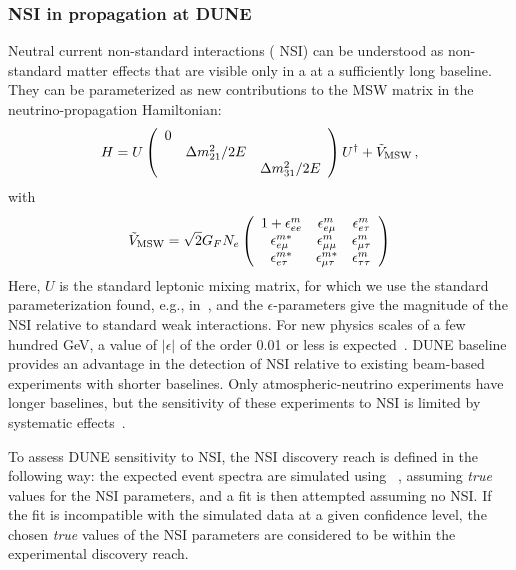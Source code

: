 \subsubsection{NSI in propagation at DUNE}
Neutral current non-standard interactions ( NSI) can be understood as non-standard
matter effects that are visible only in a  at a sufficiently long baseline. They can be parameterized as new contributions
to the MSW matrix in the neutrino-propagation Hamiltonian:
\begin{equation}
  H = U \left( \begin{array}{ccc}
           0 &                    & \\
             & \Delta m_{21}^2/2E & \\
             &                    & \Delta m_{31}^2/2E
         \end{array} \right) U^\dag + \tilde{V}_{\rm MSW} \,,
\end{equation}
with
\begin{equation}
  \tilde{V}_{\rm MSW} = \sqrt{2} G_F N_e
\left(
  \begin{array}{ccc}
    1 + \epsilon^m_{ee}       & \epsilon^m_{e\mu}       & \epsilon^m_{e\tau}  \\
        \epsilon^{m*}_{e\mu}  & \epsilon^m_{\mu\mu}     & \epsilon^m_{\mu\tau} \\
        \epsilon^{m*}_{e\tau} & \epsilon^{m*}_{\mu\tau} & \epsilon^m_{\tau\tau}
  \end{array} 
\right)
\label{eq:epsmatrix}
\end{equation}
Here, $U$ is the standard  leptonic mixing matrix, for which we use the standard parameterization found, e.g., in~\cite{Agashe:2014kda}, and the $\epsilon$-parameters give the
magnitude of the NSI relative to standard weak interactions.  For new physics
scales of a few hundred GeV,  a value of $|\epsilon|$ of the order
0.01 or less is
expected~\cite{Davidson:2003ha,GonzalezGarcia:2007ib,Biggio:2009nt}. DUNE
baseline provides an advantage in the detection of NSI relative
to existing beam-based experiments with shorter baselines.
Only atmospheric-neutrino experiments have longer baselines, but the sensitivity
of these experiments to NSI is limited by systematic effects~\cite{Adams:2013qkq}.

To assess DUNE sensitivity to  NSI, the NSI discovery reach
is defined in the following way: the expected event spectra are
simulated using  ~\cite{Huber:2004ka,Huber:2007ji}, assuming \emph{true} values for the NSI
parameters, and a fit is then attempted assuming no NSI. If the fit is
incompatible with the simulated data at a given confidence level,
the chosen \emph{true} values of the NSI parameters are considered to be within the experimental discovery reach.

